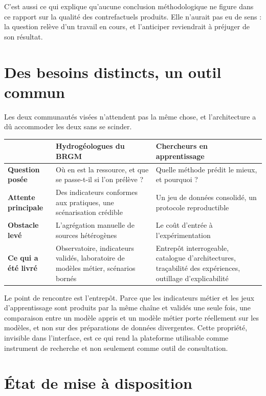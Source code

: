 C'est aussi ce qui explique qu'aucune conclusion méthodologique ne figure dans ce rapport sur la
qualité des contrefactuels produits. Elle n'aurait pas eu de sens : la question relève d'un
travail en cours, et l'anticiper reviendrait à préjuger de son résultat.

\section{Des besoins distincts, un outil commun}

Les deux communautés visées n'attendent pas la même chose, et l'architecture a dû accommoder les
deux sans se scinder.

\begin{center}
\begin{tabularx}{\textwidth}{@{}p{3.6cm}XX@{}}
\toprule
 & \textbf{Hydrogéologues du BRGM} & \textbf{Chercheurs en apprentissage} \\
\midrule
\textbf{Question posée} & Où en est la ressource, et que se passe-t-il si l'on prélève ? &
Quelle méthode prédit le mieux, et pourquoi ? \\
\textbf{Attente principale} & Des indicateurs conformes aux pratiques, une scénarisation
crédible & Un jeu de données consolidé, un protocole reproductible \\
\textbf{Obstacle levé} & L'agrégation manuelle de sources hétérogènes & Le coût d'entrée à
l'expérimentation \\
\textbf{Ce qui a été livré} & Observatoire, indicateurs validés, laboratoire de modèles métier,
scénarios bornés & Entrepôt interrogeable, catalogue d'architectures, traçabilité des
expériences, outillage d'explicabilité \\
\bottomrule
\end{tabularx}
\end{center}

Le point de rencontre est l'entrepôt. Parce que les indicateurs métier et les jeux
d'apprentissage sont produits par la même chaîne et validés une seule fois, une comparaison
entre un modèle appris et un modèle métier porte réellement sur les modèles, et non sur des
préparations de données divergentes. Cette propriété, invisible dans l'interface, est ce qui rend
la plateforme utilisable comme instrument de recherche et non seulement comme outil de
consultation.

\section{État de mise à disposition}


